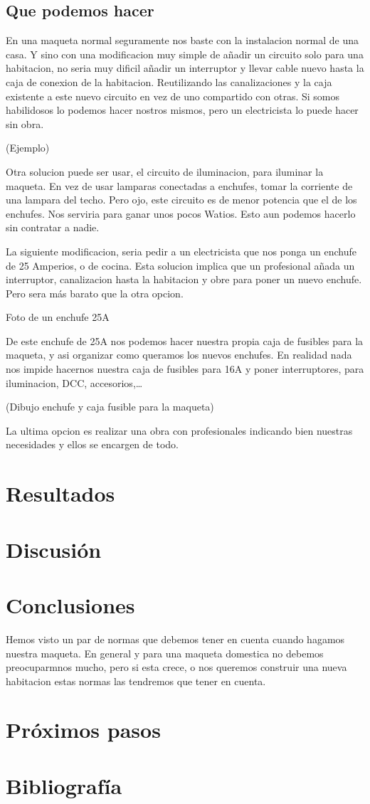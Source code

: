 \subsection{Que podemos hacer}
En una maqueta normal seguramente nos baste con la instalacion normal de una casa. Y sino con una modificacion muy simple de añadir un circuito solo para una habitacion, no seria muy dificil añadir un interruptor y llevar cable nuevo hasta la caja de conexion de la habitacion. Reutilizando las canalizaciones y la caja existente a este nuevo circuito en vez de uno compartido con otras. Si somos habilidosos lo podemos hacer nostros mismos, pero un electricista lo puede hacer sin obra.

(Ejemplo)

Otra solucion puede ser usar, el circuito de iluminacion, para iluminar la maqueta. En vez de usar lamparas conectadas a enchufes, tomar la corriente de una lampara del techo. Pero ojo, este circuito es de menor potencia que el de los enchufes. Nos serviria para ganar unos pocos Watios. Esto aun podemos hacerlo sin contratar a nadie.

La siguiente modificacion, seria pedir a un electricista que nos ponga un enchufe de 25 Amperios, o de cocina. Esta solucion implica que un profesional añada un interruptor, canalizacion hasta la habitacion y obre para poner un nuevo enchufe. Pero sera más barato que la otra opcion.

Foto de un enchufe 25A

De este enchufe de 25A nos podemos hacer nuestra propia caja de fusibles para la maqueta, y asi organizar como queramos los nuevos enchufes. En realidad nada nos impide hacernos nuestra caja de fusibles para 16A y poner interruptores, para iluminacion, DCC, accesorios,\dots

(Dibujo enchufe y caja fusible para la maqueta)

La ultima opcion es realizar una obra con profesionales indicando bien nuestras necesidades y ellos se encargen de todo.
\section{Resultados} 
\section{Discusión}
\section{Conclusiones}
Hemos visto un par de normas que debemos tener en cuenta cuando hagamos nuestra maqueta. En general y para una maqueta domestica no debemos preocuparmnos mucho, pero si esta crece, o nos queremos construir una nueva habitacion estas normas las tendremos que tener en cuenta.



\section{Próximos pasos}

\section{Bibliografía}
\printbibliography[heading=subbibliography]
	
